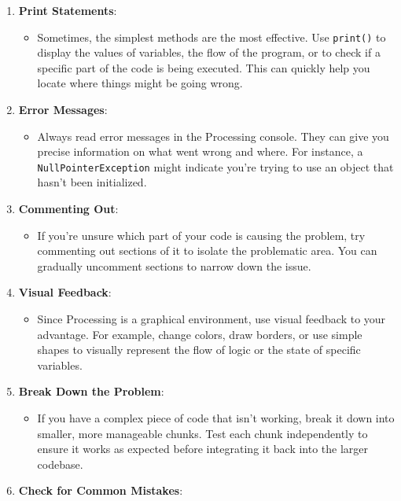 \documentclass[
]{article}
\author{}
\date{}
\begin{document}
\begin{enumerate}
\def\labelenumi{\arabic{enumi}.}
\item
  \textbf{Print Statements}:

  \begin{itemize}
  \item
    Sometimes, the simplest methods are the most effective. Use
    \texttt{print()} to display the values of variables, the flow of the
    program, or to check if a specific part of the code is being
    executed. This can quickly help you locate where things might be
    going wrong.
  \end{itemize}
\item
  \textbf{Error Messages}:

  \begin{itemize}
  \item
    Always read error messages in the Processing console. They can give
    you precise information on what went wrong and where. For instance,
    a \texttt{NullPointerException} might indicate you're trying to use
    an object that hasn't been initialized.
  \end{itemize}
\item
  \textbf{Commenting Out}:

  \begin{itemize}
  \item
    If you're unsure which part of your code is causing the problem, try
    commenting out sections of it to isolate the problematic area. You
    can gradually uncomment sections to narrow down the issue.
  \end{itemize}
\item
  \textbf{Visual Feedback}:

  \begin{itemize}
  \item
    Since Processing is a graphical environment, use visual feedback to
    your advantage. For example, change colors, draw borders, or use
    simple shapes to visually represent the flow of logic or the state
    of specific variables.
  \end{itemize}
\item
  \textbf{Break Down the Problem}:

  \begin{itemize}
  \item
    If you have a complex piece of code that isn't working, break it
    down into smaller, more manageable chunks. Test each chunk
    independently to ensure it works as expected before integrating it
    back into the larger codebase.
  \end{itemize}
\item
  \textbf{Check for Common Mistakes}:


\end{enumerate}
\end{document}

